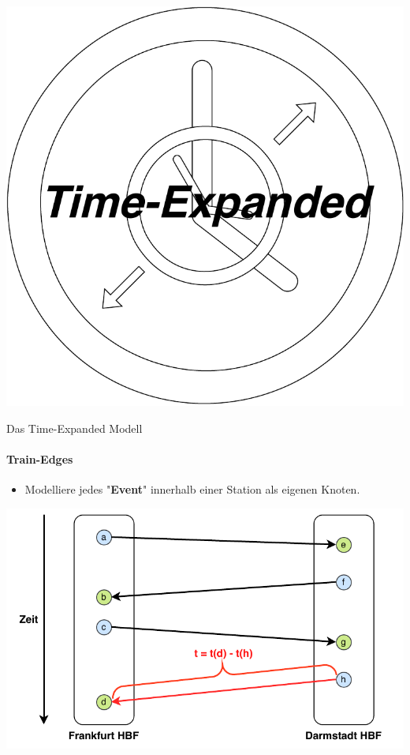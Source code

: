 \begin{frame}
	\vspace{2em}
	\begin{center}
		\includegraphics[width=.50\linewidth]{images/time-expanded/title.pdf} 
	\end{center}
\end{frame}


\begin{frame}{Das Time-Expanded Modell}
\framesubtitle{Train-Edges}
	\begin{itemize}{}
		\item Modelliere jedes "{}\textbf{Event}"{} innerhalb einer Station als eigenen Knoten. 
	\end{itemize}

	\begin{center}
		\includegraphics[width=.72\linewidth]{images/time-expanded-basic.pdf} 
	\end{center}
\end{frame}


